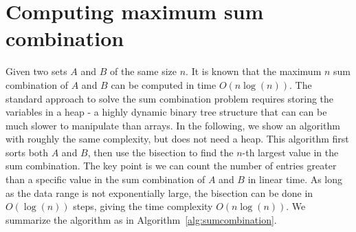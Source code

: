 \documentclass[onefignum, onetabnum]{siamart190516}
\newcommand{\<}{\langle}
\renewcommand{\>}{\rangle}
\begin{document}
\section{Computing maximum sum combination}\label{sec:maxsum}
Given two sets $A$ and $B$ of the same size $n$.
It is known that the maximum $n$ sum combination of $A$ and $B$ can be computed in time $O(n\log(n))$.
The standard approach to solve the sum combination problem requires storing the variables in a heap - a highly dynamic binary tree structure that can can be much slower to manipulate than arrays.
In the following, we show an algorithm with roughly the same complexity, but does not need a heap.
This algorithm first sorts both $A$ and $B$, then use the bisection to find the $n$-th largest value in the sum combination.
The key point is we can count the number of entries greater than a specific value
in the sum combination of $A$ and $B$ in linear time.
As long as the data range is not exponentially large, the bisection can be done in $O(\log(n))$ steps, giving the time complexity $O(n\log(n))$.
We summarize the algorithm as in Algorithm~\ref{alg:sumcombination}.
\end{document}
